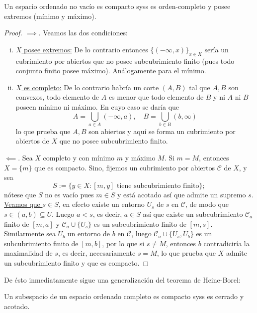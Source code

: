 \documentclass[topologia-analisis.tex]{subfiles}
\begin{document}
\begin{thmi}
	Un espacio ordenado no vacío es compacto syss es orden-completo y posee extremos (mínimo y máximo).
\end{thmi}
\begin{proof}
	$\implies$.
	Veamos las dos condiciones:
	\begin{enumerate}[i)]
		\item \underline{$X$ posee extremos:} De lo contrario entonces $\{ (-\infty, x) \}_{x\in X}$ sería un cubrimiento por abiertos
			que no posee subcubrimiento finito (pues todo conjunto finito posee máximo).
			Análogamente para el mínimo.

		\item \underline{$X$ es completo:} De lo contrario habría un corte $(A, B)$ tal que $A,B$ son convexos, todo elemento de $A$ es menor que
			todo elemento de $B$ y ni $A$ ni $B$ poseen mínimo ni máximo. En cuyo caso se daría que
			$$ A = \bigcup_{a\in A} (-\infty, a), \quad B = \bigcup_{b\in B} (b, \infty) $$
			lo que prueba que $A,B$ son abiertos y aquí se forma un cubrimiento por abiertos de $X$ que no posee subcubrimiento finito.
	\end{enumerate}

	$\impliedby$.
	Sea $X$ completo y con mínimo $m$ y máximo $M$.
	Si $m = M$, entonces $X = \{m\}$ que es compacto.
	Sino, fijemos un cubrimiento por abiertos $\mathcal{C}$ de $X$, y sea
	$$ S := \{ y \in X : [m, y] \text{ tiene subcubrimiento finito} \}; $$
	nótese que $S$ no es vacío pues $m \in S$ y está acotado así que admite un supremo $s$.
	\underline{Veamos que $s \in S$}, en efecto existe un entorno $U_s$ de $s$ en $\mathcal{C}$, de modo que $s \in (a, b) \subseteq U$.
	Luego $a < s$, es decir, $a \in S$ así que existe un subcubrimiento $\mathcal{C}_a$ finito de $[m, a]$ y $\mathcal{C}_a \cup \{U_s\}$ es
	un subcubrimiento finito de $[m, s]$.
	Similarmente sea $U_b$ un entorno de $b$ en $\mathcal{C}$, luego $\mathcal{C}_a \cup \{ U_s, U_b \}$ es un subcubrimiento finito
	de $[m, b]$, por lo que si $s \ne M$, entonces $b$ contradiciría la maximalidad de $s$, es decir, necesariamente $s = M$, lo que prueba que $X$
	admite un subcubrimiento finito y que es compacto.
\end{proof}

De ésto inmediatamente sigue una generalización del teorema de Heine-Borel:
\begin{thm}
	Un subespacio de un espacio ordenado completo es compacto syss es cerrado y acotado.
\end{thm}
\end{document}
